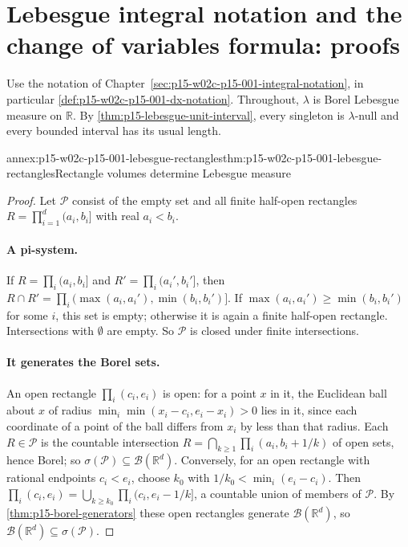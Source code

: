 \section{Lebesgue integral notation and the change of variables formula: proofs}
\label{sec:annex-p15-w02c-p15-001-integral-notation}

Use the notation of
Chapter~\ref{sec:p15-w02c-p15-001-integral-notation}, in particular
\cref{def:p15-w02c-p15-001-dx-notation}. Throughout, \(\lambda\) is Borel
Lebesgue measure on \(\mathbb R\). By
\cref{thm:p15-lebesgue-unit-interval}, every singleton is
\(\lambda\)-null and every bounded interval has its usual length.

\begin{annexitem}{annex:p15-w02c-p15-001-lebesgue-rectangles}{thm:p15-w02c-p15-001-lebesgue-rectangles}{Rectangle volumes determine Lebesgue measure}
\begin{proof}
Let \(\mathcal P\) consist of the empty set and all finite half-open
rectangles \(R=\prod_{i=1}^d(a_i,b_i]\) with real \(a_i<b_i\).

\paragraph{A pi-system.}
If \(R=\prod_i(a_i,b_i]\) and \(R'=\prod_i(a_i',b_i']\), then
\(R\cap R'=\prod_i(\max(a_i,a_i'),\min(b_i,b_i')]\). If
\(\max(a_i,a_i')\geq\min(b_i,b_i')\) for some \(i\), this set is empty;
otherwise it is again a finite half-open rectangle. Intersections with
\(\emptyset\) are empty. So \(\mathcal P\) is closed under finite
intersections.

\paragraph{It generates the Borel sets.}
An open rectangle \(\prod_i(c_i,e_i)\) is open: for a point \(x\) in it,
the Euclidean ball about \(x\) of radius
\(\min_i\min(x_i-c_i,e_i-x_i)>0\) lies in it, since each coordinate of a
point of the ball differs from \(x_i\) by less than that radius. Each
\(R\in\mathcal P\) is the countable intersection
\(R=\bigcap_{k\geq1}\prod_i(a_i,b_i+1/k)\) of open sets, hence Borel; so
\(\sigma(\mathcal P)\subseteq\mathcal B(\mathbb R^d)\). Conversely, for an
open rectangle with rational endpoints \(c_i<e_i\), choose \(k_0\) with
\(1/k_0<\min_i(e_i-c_i)\). Then
\(\prod_i(c_i,e_i)=\bigcup_{k\geq k_0}\prod_i(c_i,e_i-1/k]\), a countable
union of members of \(\mathcal P\). By \cref{thm:p15-borel-generators}
these open rectangles generate \(\mathcal B(\mathbb R^d)\), so
\(\mathcal B(\mathbb R^d)\subseteq\sigma(\mathcal P)\).


\end{proof}
\end{annexitem}
